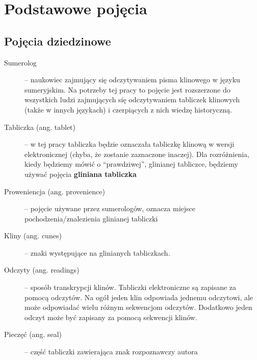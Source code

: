 \section{Podstawowe pojęcia}\label{r:pojecia}
\subsection{Pojęcia dziedzinowe}
\begin{description}
 \item[Sumerolog] -- naukowiec zajmujący się odczytywaniem pisma klinowego w języku sumeryjskim. Na potrzeby tej pracy
		      to pojęcie jest rozszerzone do wszystkich ludzi zajmujących się odczytywaniem tabliczek klinowych (także w innych językach) i czerpiących z nich wiedzę historyczną.
 \item[Tabliczka (ang. tablet)] -- w tej pracy tabliczka będzie oznaczała tabliczkę klinową w wersji elektronicznej 
		  (chyba, że zostanie zaznaczone inaczej). Dla rozróżnienia, kiedy będziemy mówić o ``prawdziwej'', 
		  glinianej tabliczce, będziemy używać pojęcia \textbf{gliniana tabliczka}
 \item[Proweniencja (ang. provenience)] -- pojęcie używane przez sumerologów, oznacza miejsce pochodzenia/znalezienia glinianej tabliczki
 \item[Kliny (ang. cunes)] -- znaki występujące na glinianych tabliczkach.
 \item[Odczyty (ang. readings)] -- sposób transkrypcji klinów. Tabliczki elektroniczne są zapisane za pomocą odczytów. 
Na ogół jeden klin odpowiada jednemu odczytowi, ale może odpowiadać wielu różnym sekwencjom odczytów. 
Dodatkowo jeden odczyt może być zapisany za pomocą sekwencji klinów.
 \item[Pieczęć (ang. seal)] -- część tabliczki zawierająca znak rozpoznawczy autora
\end{description}

